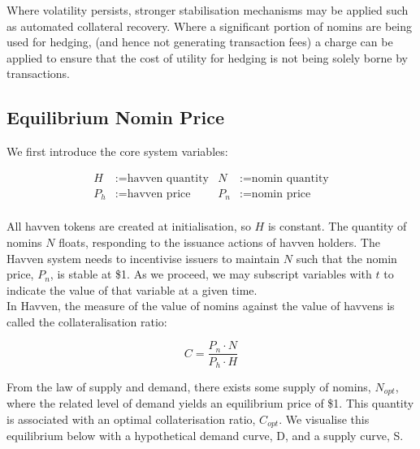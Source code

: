 \vspace{2mm}

\noindent Where volatility persists, stronger stabilisation mechanisms may be applied such as automated collateral recovery. Where a significant portion of nomins are being used for hedging, (and hence not generating transaction fees) a charge can be applied to ensure that the cost of utility for hedging is not being solely borne by transactions.

\newpage

\subsection{Equilibrium Nomin Price}

\noindent We first introduce the core system variables:

\begin{align*}
H &:= \text{havven quantity} & N &:= \text{nomin quantity} \\
P_h &:= \text{havven price}  & P_n &:= \text{nomin price} \\
\end{align*}


\noindent All havven tokens are created at initialisation, so $H$ is constant.
The quantity of nomins $N$ floats, responding to the issuance actions of havven holders.
The Havven system needs to incentivise issuers to maintain $N$ such that
the nomin price, $P_n$, is stable at \$1.
As we proceed, we may subscript variables with $t$ to indicate the value of that
variable at a given time. \\

\noindent In Havven, the measure of the value of nomins against the value
of havvens is called the collateralisation ratio:

\begin{equation}
C = \frac{P_n \cdot N}{P_h \cdot H} \label{eq:collateralisation}
\end{equation}

\vspace{3 mm}

\noindent From the law of supply and demand, there exists some supply
of nomins, $N_{opt}$, where the related level of demand yields an equilibrium
price of \$1. This quantity is associated with an optimal collaterisation ratio,
$C_{opt}$. We visualise this equilibrium below with a hypothetical demand
curve, D, and a supply curve, S.  \\

